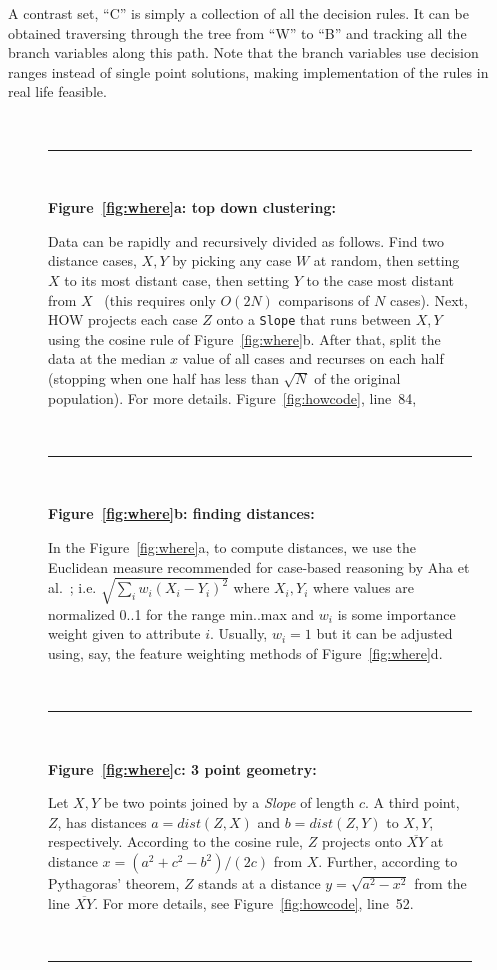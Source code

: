 \documentclass[conference]{IEEEtran}
\newcommand{\fig}[1]{Figure~\ref{fig:#1}}
\begin{document}
A contrast set, ``C'' is simply a collection of all the decision rules. It can be obtained traversing through the tree from ``W'' to ``B'' and tracking all the branch variables along this path. Note that the branch variables use decision ranges instead of single point solutions, making implementation of the rules in real life feasible. 
\begin{figure}[t]
    \small
    ~\hrule~
    
    {\bf \fig{where}a: top down clustering:}
    
    Data can be rapidly and recursively divided   as follows.
    Find   two   distance cases,  $X,Y$
    by picking any case $W$ at random, then setting $X$ to its most
    distant case, then setting $Y$ to the case most distant from
    $X$~\cite{fastmap}
    (this requires only $O(2N)$ comparisons
    of $N$ cases).
    Next, HOW projects each case $Z$
    onto a {\tt Slope} that  runs between $X,Y$ using the cosine
    rule of \fig{where}b. After that,  split the data at the median $x$ value of all cases and
    recurses on each half  (stopping when
    one half has less  than $\sqrt{N}$ of the original population). For more details. \fig{howcode}, line~84, 
    
    ~\hrule~
    
    {\bf \fig{where}b: finding distances:}
    
    In the \fig{where}a, to compute distances, we use
    the Euclidean measure recommended for
    case-based reasoning by Aha et al.~\cite{aha91};
    i.e. $\sqrt{\sum_iw_i(X_i-Y_i)^2}$ where $X_i,Y_i$
    where values are  normalized 0..1 for the range min..max and 
    $w_i$ is some importance weight given to attribute $i$.
    Usually, $w_i=1$ but it can be adjusted using, say,
    the feature weighting methods of \fig{where}d. 
    
    ~\hrule~
    
    {\bf \fig{where}c: 3 point geometry:}
    
    Let   $X,Y$ be two points joined by  a {\em Slope} of  length $c$.
    A third point, $Z$, has distances  $a=dist(Z,X)$ and
    $b=dist(Z,Y)$ to $X,Y$, respectively.
    According to the cosine rule,   $Z$ projects onto  $\overline{XY}$
    at distance $x=(a^2 + c^2 - b^2)/(2c)$ from $X$.
    Further, according to Pythagoras' theorem, $Z$ stands at a distance
    $y = \sqrt{a^2 - x^2}$ from the line $\overline{XY}$. For more details, see  \fig{howcode}, line~52.
    
    ~\hrule~
    

\end{figure}
\end{document}

